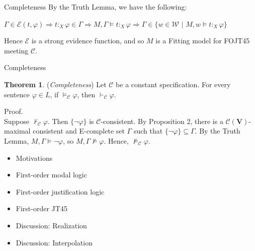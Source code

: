 \documentclass{beamer}
\theoremstyle{definition}
\newtheorem{teor}{Theorem}
\newcommand{\C}{\mathcal{C}}
\newcommand{\W}{\mathcal{W}}
\newcommand{\E}{\mathcal{E}}
\newcommand{\nmodels}{\not\models}
\newcommand{\nao}{\neg}
\newcommand{\teo}{\vdash}
\begin{document}
\begin{frame}{Completeness}
\qquad By the Truth Lemma, we have the following:\\

\begin{center}
$\Gamma \in \E(t,\varphi) \Rightarrow t$$:_{X}$$\varphi \in \Gamma \Rightarrow M,\Gamma \models t$$:_{X}$$\varphi \Rightarrow \Gamma \in \{w \in \W$ $|$ $ M,w \models t$$:_{X}$$\varphi\}$	
\end{center}
\qquad Hence $\E$ is a strong evidence function, and so $M$ is a Fitting model for FOJT45 meeting $\C$. 
\end{frame}

\begin{frame}{Completeness}
\begin{teor}
(\textit{Completeness}) Let $\C$ be a constant specification. For every sentence $\varphi \in L$, if $\models_{\C} \varphi$, then $\teo_{\C}\varphi$.
\end{teor}
	
{\color{blue} Proof.}\\
Suppose $\not\teo_{\C}\varphi$. Then $\{\nao \varphi\}$ is $\C$-consistent. By Proposition 2, there is a $\C(\textbf{V})$-maximal consistent and E-complete set $\Gamma$ such that  $\{\nao \varphi\} \subseteq \Gamma$. By the Truth Lemma, $M,\Gamma \models \nao \varphi$, so  $M,\Gamma \nmodels \varphi$. Hence, $\nmodels_{\C} \varphi$.     
\end{frame}


\begin{frame}
	\begin{itemize}
		\item[] Motivations
		\vspace{5mm}	
		\item[] First-order modal logic
		\vspace{5mm}
		\item[] First-order justification logic
		\vspace{5mm}
		\item[] First-order JT45
		\vspace{5mm}
		\item[] {\color{blue}Discussion: Realization}
		\vspace{5mm}
		\item[] Discussion: Interpolation
	\end{itemize} 
\end{frame}
\end{document}

